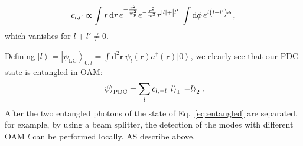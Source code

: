 \documentclass[
reprint,
amsmath,amssymb,
aps,
showkeys
]{revtex4-2}
\begin{document}
\begin{align}\label{eq:cll}
    c_{l,l'} \propto
    \int r\,{\rm d}r \, e^{-\frac{r^2}{w_p^2}} e^{-\frac{r^2}{w^2}} 
    r^{\left|l\right|+\left|l'\right|}
    \int {\rm d}\phi \, e^{i \left(l+l'\right) \phi}
    \, ,
\end{align}
%
which vanishes for $l+l' \neq 0$.

Defining $\left|l\right> = \left|\psi_\mathrm{LG}\right>_{0,l} = \int \mathrm{d}^2 \mathbf{r} \, \psi_{l}\left(\mathbf{r}\right) a^{\dagger}\left(\mathbf{r}\right)\left|0\right>$, we clearly see that our PDC state is entangled in OAM:
%
\begin{align}\label{eq:entangled}
    \left|\psi\right>_{\rm PDC} =
    \sum_l c_{l,-l} \left|l\right>_1 \left|-l\right>_2
    \, .
\end{align}
%
After the two entangled photons of the state of Eq.~\ref{eq:entangled} are separated, for example, by using a beam splitter, the detection of the modes with different OAM $l$ can be performed locally. AS describe above.
\end{document}
